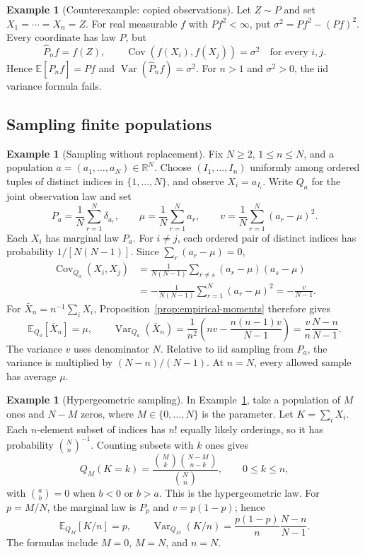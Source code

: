 \documentclass[11pt,oneside]{book}
\theoremstyle{definition}
\newtheorem{example}[theorem]{Example}
\theoremstyle{remark}
\newcommand{\R}{\mathbb R}
\begin{document}
\begin{example}[Counterexample: copied observations]
\label{ex:copied-observations}
Let $Z\sim P$ and set $X_1=\cdots=X_n=Z$.
For real measurable $f$ with $Pf^2<\infty$, put
$\sigma^2=Pf^2-(Pf)^2$.
Every coordinate has law $P$, but
\[
\widehat P_n f=f(Z),\qquad
\operatorname{Cov}(f(X_i),f(X_j))=\sigma^2\quad\text{for every }i,j.
\]
Hence $\mathbb E[\widehat P_n f]=Pf$ and
$\operatorname{Var}(\widehat P_n f)=\sigma^2$.
For $n>1$ and $\sigma^2>0$, the iid variance formula fails.
\end{example}

\subsection{Sampling finite populations}
\label{subsec:finite-population-sampling}

\begin{example}[Sampling without replacement]
\label{ex:finite-population-variance}
Fix $N\geq2$, $1\leq n\leq N$, and a population
$a=(a_1,\ldots,a_N)\in\R^N$.
Choose $(I_1,\ldots,I_n)$ uniformly among ordered tuples of distinct
indices in $\{1,\ldots,N\}$, and observe $X_i=a_{I_i}$.
Write $Q_a$ for the joint observation law and set
\[
P_a=\frac1N\sum_{r=1}^N\delta_{a_r},\qquad
\mu=\frac1N\sum_{r=1}^N a_r,\qquad
v=\frac1N\sum_{r=1}^N(a_r-\mu)^2.
\]
Each $X_i$ has marginal law $P_a$. For $i\ne j$, each ordered pair of
distinct indices has probability $1/[N(N-1)]$. Since
$\sum_r(a_r-\mu)=0$,
\[
\begin{aligned}
\operatorname{Cov}_{Q_a}(X_i,X_j)
&=\frac1{N(N-1)}\sum_{r\ne s}(a_r-\mu)(a_s-\mu)\\
&=-\frac1{N(N-1)}\sum_{r=1}^N(a_r-\mu)^2
=-\frac v{N-1}.
\end{aligned}
\]
For $\bar X_n=n^{-1}\sum_iX_i$,
Proposition~\ref{prop:empirical-moments} therefore gives
\begin{equation}
\mathbb E_{Q_a}[\bar X_n]=\mu,\qquad
\operatorname{Var}_{Q_a}(\bar X_n)
=\frac1{n^2}\left(nv-\frac{n(n-1)v}{N-1}\right)
=\frac vn\frac{N-n}{N-1}.
\label{eq:finite-population-variance}
\end{equation}
The variance $v$ uses denominator $N$.
Relative to iid sampling from $P_a$, the variance is multiplied by
$(N-n)/(N-1)$. At $n=N$, every allowed sample has average $\mu$.
\end{example}

\begin{example}[Hypergeometric sampling]
\label{ex:hypergeometric}
In Example~\ref{ex:finite-population-variance}, take a population of $M$ ones
and $N-M$ zeros, where $M\in\{0,\ldots,N\}$ is the parameter.
Let $K=\sum_iX_i$. Each $n$-element subset of indices has $n!$ equally
likely orderings, so it has probability $\binom Nn^{-1}$.
Counting subsets with $k$ ones gives
\[
Q_M(K=k)=\frac{\binom Mk\binom{N-M}{n-k}}{\binom Nn},
\qquad 0\leq k\leq n,
\]
with $\binom ab=0$ when $b<0$ or $b>a$.
This is the hypergeometric law.
For $p=M/N$, the marginal law is $P_p$ and $v=p(1-p)$; hence
\[
\mathbb E_{Q_M}[K/n]=p,\qquad
\operatorname{Var}_{Q_M}(K/n)
=\frac{p(1-p)}n\frac{N-n}{N-1}.
\]
The formulas include $M=0$, $M=N$, and $n=N$.
\end{example}
\end{document}
